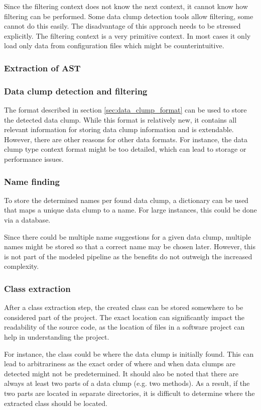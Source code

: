 Since the filtering context does not know the next context, it cannot know how filtering can be performed. Some data clump detection tools allow filtering, some cannot do this easily. The disadvantage of this approach needs to be stressed explicitly. The filtering context is a very primitive context. In most cases it only load only data from configuration files which might be counterintuitive. 

\subsubsection{Extraction of AST}
\subsubsection{Data clump detection and filtering}

The format described in section \ref{sec:data_clump_format} can be used to store the detected data clump. While this format is relatively new, it contains all relevant information for storing data clump information and is extendable. However, there are other reasons for other data formats. For instance,  the data clump type context format might be too detailed, which can lead to storage or performance issues. 

\subsubsection{Name finding}
To store the determined names per found data clump, a dictionary can be used that maps a unique data clump to a name. For large instances, this could be done via a database. 

Since there could be multiple name suggestions for a given data clump, multiple names might be stored so that a correct name may be chosen later. However, this is not part of the modeled pipeline as the benefits do not outweigh the increased complexity.

\subsubsection{Class extraction}

After a class extraction step, the created class can be stored somewhere to be considered part of the project. The exact location can significantly impact the readability of the source code, as the location of files in a software project can help in understanding the project. 

For instance, the class could be where the data clump is initially found. This can lead to arbitrariness as the exact order of where and when data clumps are detected might not be predetermined. It should also be noted that there are always at least two parts of a data clump (e.g. two methods). As a result, if the two parts are located in separate directories, it is difficult to determine where the extracted class should be located. 

